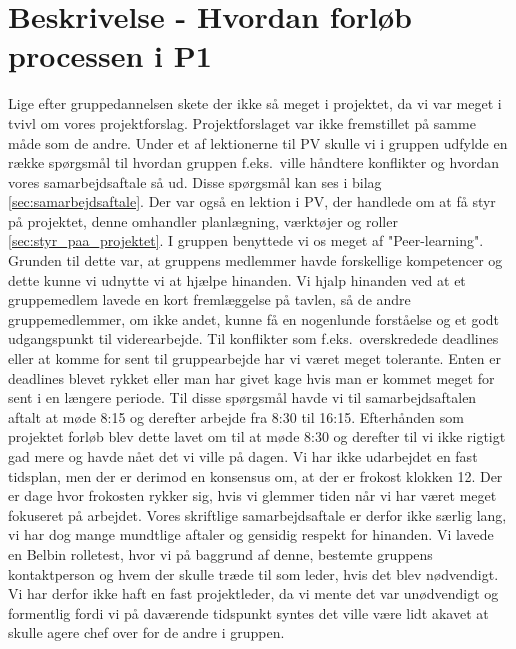 \documentclass[oneside,a4paper,titlepage]{article}
\begin{document}
\section{Beskrivelse - Hvordan forløb processen i P1}

Lige efter gruppedannelsen skete der ikke så meget i projektet, da vi var meget i tvivl om vores projektforslag. Projektforslaget var ikke fremstillet på samme måde som de andre. Under et af lektionerne til PV skulle vi i gruppen udfylde en række spørgsmål til  hvordan gruppen f.eks.\ ville håndtere konflikter og hvordan vores samarbejdsaftale så ud. Disse spørgsmål kan ses i bilag \ref{sec:samarbejdsaftale}. Der var også en lektion i PV, der handlede om at få styr på projektet, denne omhandler planlægning, værktøjer og roller \ref{sec:styr_paa_projektet}.\newline\newline
I gruppen benyttede vi os meget af "Peer-learning". Grunden til dette var, at gruppens medlemmer havde forskellige kompetencer og dette kunne vi udnytte vi at hjælpe hinanden. Vi hjalp hinanden ved at et gruppemedlem lavede en kort fremlæggelse på tavlen, så de andre gruppemedlemmer, om ikke andet, kunne få en nogenlunde forståelse og et godt udgangspunkt til viderearbejde.
Til konflikter som f.eks.\ overskredede deadlines eller at komme for sent til gruppearbejde har vi været meget tolerante. Enten er deadlines blevet rykket eller man har givet kage hvis man er kommet meget for sent i en længere periode. \newline\newline
Til disse spørgsmål havde vi til samarbejdsaftalen aftalt at møde 8:15 og derefter arbejde fra 8:30 til 16:15. Efterhånden som projektet forløb blev dette lavet om til at møde 8:30 og derefter til vi ikke rigtigt gad mere og havde nået det vi ville på dagen. Vi har ikke udarbejdet en fast tidsplan, men der er derimod en konsensus om, at der er frokost klokken 12. Der er dage hvor frokosten rykker sig, hvis vi glemmer tiden når vi har været meget fokuseret på arbejdet. Vores skriftlige samarbejdsaftale er derfor ikke særlig lang, vi har dog mange mundtlige aftaler og gensidig respekt for hinanden. \newline\newline
Vi lavede en Belbin rolletest, hvor vi på baggrund af denne, bestemte gruppens kontaktperson og hvem der skulle træde til som leder, hvis det blev nødvendigt. Vi har derfor ikke haft en fast projektleder, da vi mente det var unødvendigt og formentlig fordi vi på daværende tidspunkt syntes det ville være lidt akavet at skulle agere chef over for de andre i gruppen.\newline\newline
\end{document}
